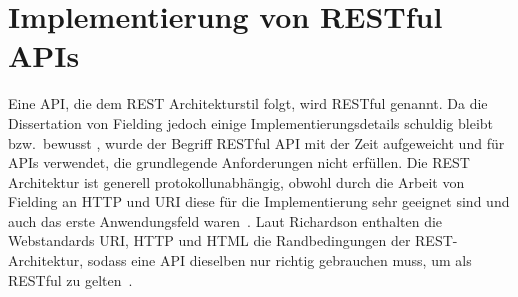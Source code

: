 \section{Implementierung von RESTful APIs}
Eine API, die dem REST Architekturstil folgt, wird RESTful genannt.
Da die Dissertation von Fielding jedoch einige Implementierungsdetails schuldig bleibt bzw.\ bewusst , wurde der Begriff RESTful API mit der Zeit aufgeweicht und für APIs verwendet, die grundlegende Anforderungen nicht erfüllen.\cite[vgl.][]{fieldBlog}
Die REST Architektur ist generell protokollunabhängig, obwohl durch die Arbeit von Fielding an HTTP und URI diese für die Implementierung sehr geeignet sind und auch das erste Anwendungsfeld waren~\cite[vgl.][109,116]{REST}.
Laut Richardson enthalten die Webstandards URI, HTTP und HTML die Randbedingungen der REST-Architektur, sodass eine API dieselben nur richtig gebrauchen muss, um als RESTful zu gelten~\cite[vgl.][]{Richardson}.

